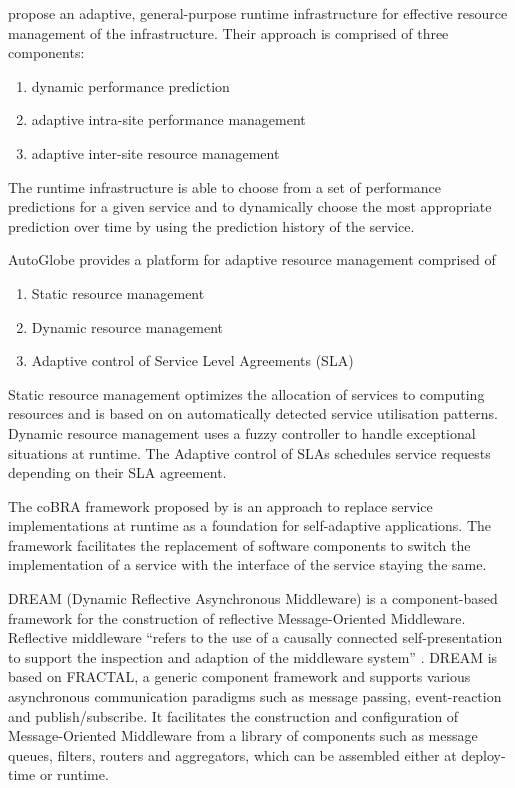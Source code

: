 \citet{Lee:2009vn} propose an adaptive, general-purpose runtime infrastructure for effective resource management of the infrastructure. Their approach is comprised of three components:
\begin{enumerate}
	\item dynamic performance prediction
	\item adaptive intra-site performance management
	\item adaptive inter-site resource management
\end{enumerate}

The runtime infrastructure is able to choose from a set of performance predictions for a given service and to dynamically choose the most appropriate prediction over time by using the prediction history of the service.

AutoGlobe \citep{Gmach:2008vo} provides a platform for adaptive resource management comprised of 
\begin{enumerate}
	\item Static resource management
	\item Dynamic resource management
	\item Adaptive control of Service Level Agreements (SLA)
\end{enumerate}
Static resource management optimizes the allocation of services to computing resources and is based on on automatically detected service utilisation patterns. Dynamic resource management uses a fuzzy controller to handle exceptional situations at runtime. The Adaptive control of \acp{SLA} schedules service requests depending on their \ac{SLA} agreement.

The coBRA framework proposed by \citet{Irmert:2008nx} is an approach to replace service implementations at runtime as a foundation for self-adaptive applications. The framework facilitates the replacement of software components to switch the implementation of a service with the interface of the service staying the same.

DREAM (Dynamic Reflective Asynchronous Middleware) \citep{Leclercq:2004ly} is a component-based framework for the construction of reflective Message-Oriented Middleware. Reflective middleware ``refers to the use of a causally connected self-presentation to support the inspection and adaption of the middleware system'' \citep{Kon:2002fu}. DREAM is based on FRACTAL, a generic component framework and supports various asynchronous communication paradigms such as message passing, event-reaction and publish/subscribe. It facilitates the construction and configuration of Message-Oriented Middleware from a library of components such as message queues, filters, routers and aggregators, which can be assembled either at deploy-time or runtime.

